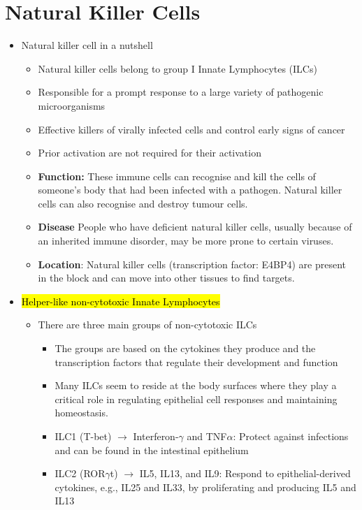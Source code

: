 \documentclass[a4paper, 12pt]{article}
\begin{document}
\section{Natural Killer Cells}
\begin{itemize}
\item{Natural killer cell in a nutshell}
\begin{itemize}
\item{Natural killer cells belong to group I Innate Lymphocytes (ILCs)}
\item{Responsible for a prompt response to a large variety of pathogenic microorganisms}
\item{Effective killers of virally infected cells and control early signs of cancer}
\item{Prior activation are not required for their activation}
\item{\textbf{Function:} These immune cells can recognise and kill the cells of someone's body that had been infected with a pathogen. Natural killer cells can also recognise and destroy tumour cells.}
\item{\textbf{Disease} People who have deficient natural killer cells, usually because of an inherited immune disorder, may be more prone to certain viruses.}
\item{\textbf{Location}: Natural killer cells (transcription factor: E4BP4) are present in the block and can move into other tissues to find targets.}
\end{itemize}
\item{\hl{Helper-like non-cytotoxic Innate Lymphocytes}}
\begin{itemize}
\item{There are three main groups of non-cytotoxic ILCs}
\begin{itemize}
\item{The groups are based on the cytokines they produce and the transcription factors that regulate their development and function}
\item{Many ILCs seem to reside at the body surfaces where they play a critical role in regulating epithelial cell responses and maintaining homeostasis.}
\item{ILC1 (T-bet) $\rightarrow$ Interferon-$\gamma$ and TNF$\alpha$: Protect against infections and can be found in the intestinal epithelium}
\item{ILC2 (ROR$\gamma$t) $\rightarrow$ IL5, IL13, and IL9: Respond to epithelial-derived cytokines, e.g., IL25 and IL33, by proliferating and producing IL5 and IL13}

\end{itemize}
\end{itemize}
\end{itemize}
\end{document}
